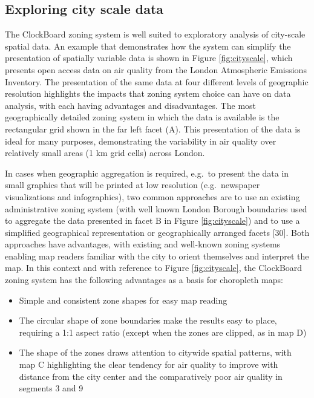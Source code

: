 \documentclass{josis}
\providecommand{\tightlist}{%
  \setlength{\itemsep}{0pt}\setlength{\parskip}{0pt}}
\begin{document}
\hypertarget{exploring-city-scale-data}{%
\subsection{Exploring city scale data}\label{exploring-city-scale-data}}

The ClockBoard zoning system is well suited to exploratory analysis of city-scale spatial data.
An example that demonstrates how the system can simplify the presentation of spatially variable data is shown in Figure \ref{fig:cityscale}, which presents open access data on air quality from the London Atmospheric Emissions Inventory.
The presentation of the same data at four different levels of geographic resolution highlights the impacts that zoning system choice can have on data analysis, with each having advantages and disadvantages.
The most geographically detailed zoning system in which the data is available is the rectangular grid shown in the far left facet (A).
This presentation of the data is ideal for many purposes, demonstrating the variability in air quality over relatively small areas (1 km grid cells) across London.

In cases when geographic aggregation is required, e.g.~to present the data in small graphics that will be printed at low resolution (e.g.~newspaper visualizations and infographics), two common approaches are to use an existing administrative zoning system (with well known London Borough boundaries used to aggregate the data presented in facet B in Figure \ref{fig:cityscale}) and to use a simplified geographical representation or geographically arranged facets {[}30{]}.
Both approaches have advantages, with existing and well-known zoning systems enabling map readers familiar with the city to orient themselves and interpret the map.
In this context and with reference to Figure \ref{fig:cityscale}, the ClockBoard zoning system has the following advantages as a basis for choropleth maps:

\begin{itemize}
\tightlist
\item
  Simple and consistent zone shapes for easy map reading
\item
  The circular shape of zone boundaries make the results easy to place, requiring a 1:1 aspect ratio (except when the zones are clipped, as in map D)
\item
  The shape of the zones draws attention to citywide spatial patterns, with map C highlighting the clear tendency for air quality to improve with distance from the city center and the comparatively poor air quality in segments 3 and 9
\end{itemize}
\end{document}
